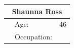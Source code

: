             {\raggedright

            \vspace{3pt} \noindent
            \begin{tabular}{|p{140pt}|p{78pt}|p{207pt}|}
            \hline
            \multicolumn{3}{|c|}{\parbox{426pt}{\centering
            Shaunna Ross
            }} \\
            \hline
            \parbox{140pt}{\raggedright {}} & \parbox{78pt}{\raggedright
            Age:
            } & \parbox{207pt}{\raggedright
            46
            } \\
             & \parbox{78pt}{\raggedright
            Occupation:
}
\end{tabular}}
